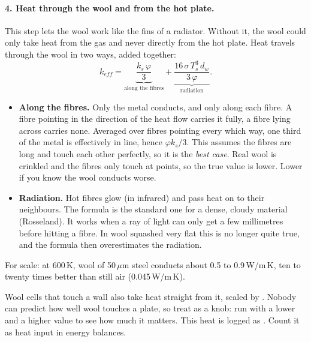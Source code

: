 \paragraph{4. Heat through the wool and from the hot plate.}
This step lets the wool work like the fins of a radiator. Without it, the wool could only take heat from the gas and never directly from the hot plate. Heat travels through the wool in two ways, added together:
\begin{equation}
k_{eff} = \underbrace{\frac{k_s\,\varphi}{3}}_{\textrm{along the fibres}} + \underbrace{\frac{16\,\sigma\,T_s^3\, d_w}{3\,\varphi}}_{\textrm{radiation}} .
\end{equation}
\begin{itemize}
    \item \textbf{Along the fibres.} Only the metal conducts, and only along each fibre. A fibre pointing in the direction of the heat flow carries it fully, a fibre lying across carries none. Averaged over fibres pointing every which way, one third of the metal is effectively in line, hence $\varphi k_s/3$. This assumes the fibres are long and touch each other perfectly, so it is the \emph{best case}. Real wool is crinkled and the fibres only touch at points, so the true value is lower. Lower  if you know the wool conducts worse.
    \item \textbf{Radiation.} Hot fibres glow (in infrared) and pass heat on to their neighbours. The formula is the standard one for a dense, cloudy material (Rosseland). It works when a ray of light can only get a few millimetres before hitting a fibre. In wool squashed very flat this is no longer quite true, and the formula then overestimates the radiation.
\end{itemize}
For scale: at 600\,K, wool of 50\,$\mu$m steel conducts about 0.5 to 0.9\,W/m\,K, ten to twenty times better than still air (0.045\,W/m\,K).

Wool cells that touch a  wall also take heat straight from it, scaled by . Nobody can predict how well wool touches a plate, so treat  as a knob: run with a lower and a higher value to see how much it matters. This heat is logged as . Count it as heat input in energy balances.


